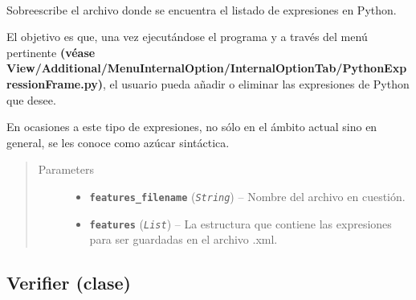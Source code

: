 \documentclass[letterpaper,10pt,english]{sphinxmanual}
\begin{document}
\begin{fulllineitems}
\begin{fulllineitems}
\label{Controller/XMLParser:Controller.XMLParser.XMLParser.write_xml_python_expressions}~
\begin{DUlineblock}{0em}
\item[] Sobreescribe el archivo donde se encuentra el listado de expresiones
en Python.
\item[] El objetivo es que, una vez ejecutándose el programa y a través del menú
pertinente \textbf{(véase View/Additional/MenuInternalOption/InternalOptionTab/PythonExpressionFrame.py)},
el usuario pueda añadir o eliminar las expresiones de Python que desee.
\item[] 
\item[] En ocasiones a este tipo de expresiones, no sólo en el ámbito actual 
sino en general, se les conoce como azúcar sintáctica.
\end{DUlineblock}
\begin{quote}\begin{description}
\item[{Parameters}] \leavevmode\begin{itemize}
\item {} 
\textbf{\texttt{features\_filename}} (\emph{\texttt{String}}) -- Nombre del archivo en cuestión.

\item {} 
\textbf{\texttt{features}} (\emph{\texttt{List}}) -- La estructura que contiene las expresiones para ser guardadas
en el archivo .xml.

\end{itemize}

\end{description}\end{quote}

\end{fulllineitems}


\end{fulllineitems}



\subsection{Verifier (clase)}
\label{Controller/Verifier:verifier-clase}\label{Controller/Verifier::doc}\label{Controller/Verifier:module-Controller.Verifier}
\end{document}
